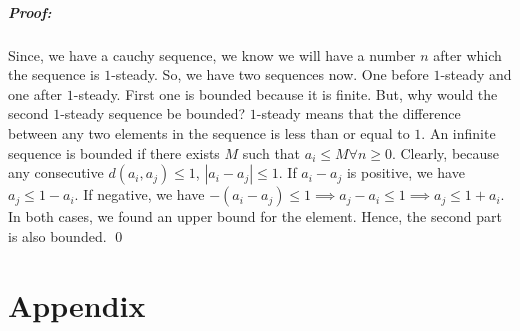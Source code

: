 \documentclass{report}
\begin{document}
\paragraph{Proof: }Since, we have a cauchy sequence, we know we will have a number $n$ after which the sequence is  $1$-steady. So, we have two sequences now. One before  $1$-steady and one after $1$-steady. First one is bounded because it is finite. But, why would the second  $1$-steady sequence be bounded? $1$-steady means that the difference between any two elements in the sequence is less than or equal to $1$.  An infinite sequence is bounded if there exists $M$ such that  $a_i \le M \forall n \ge 0$. Clearly, because any consecutive $d(a_i, a_j) \le 1$,
$|a_i - a_j| \le 1$. If $a_i - a_j$ is positive, we have  $a_j \le 1 - a_i$. If negative, we have  $-(a_i - a_j) \le 1 \implies a_j - a_i \le 1 \implies a_j \le 1 + a_i$. In both cases, we found an upper bound for the element. Hence, the second part is also bounded. 
\qed











































































\chapter*{Appendix}
\end{document}
